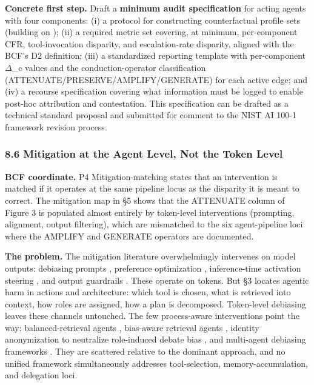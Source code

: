 \documentclass[10pt]{article}
\begin{document}
\textbf{Concrete first step.} Draft a \textbf{minimum audit specification} for acting agents with four components: (i) a protocol for constructing counterfactual profile sets (building on \cite{parziale2025systematic}); (ii) a required metric set covering, at minimum, per-component CFR, tool-invocation disparity, and escalation-rate disparity, aligned with the BCF's D2 definition; (iii) a standardized reporting template with per-component $\Delta$\_c values and the conduction-operator classification (ATTENUATE/PRESERVE/AMPLIFY/GENERATE) for each active edge; and (iv) a recourse specification covering what information must be logged to enable post-hoc attribution and contestation. This specification can be drafted as a technical standard proposal and submitted for comment to the NIST AI 100-1 framework revision process.

\subsubsection*{8.6 Mitigation at the Agent Level, Not the Token Level}

\textbf{BCF coordinate.} P4 Mitigation-matching states that an intervention is matched if it operates at the same pipeline locus as the disparity it is meant to correct. The mitigation map in \S{}5 shows that the ATTENUATE column of Figure 3 is populated almost entirely by token-level interventions (prompting, alignment, output filtering), which are mismatched to the six agent-pipeline loci where the AMPLIFY and GENERATE operators are documented.

\textbf{The problem.} The mitigation literature overwhelmingly intervenes on model outputs: debiasing prompts \cite{furniturewala2024thinking,li2024prompting}, preference optimization \cite{allam2024biasdpo,bai2022constitutional}, inference-time activation steering \cite{li2025fairsteer}, and output guardrails \cite{dong2024building}. These operate on tokens. But \S{}3 locates agentic harm in actions and architecture: which tool is chosen, what is retrieved into context, how roles are assigned, how a plan is decomposed. Token-level debiasing leaves these channels untouched. The few process-aware interventions point the way: balanced-retrieval agents \cite{singh2025biasb}, bias-aware retrieval agents \cite{singh2025bias}, identity anonymization to neutralize role-induced debate bias \cite{choi2025identity}, and multi-agent debiasing frameworks \cite{owens2024multi,xu2024mitigating}. They are scattered relative to the dominant approach, and no unified framework simultaneously addresses tool-selection, memory-accumulation, and delegation loci.
\end{document}
